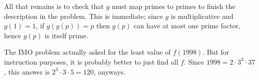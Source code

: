 All that remains is to check that $g$ must map primes to primes
to finish the description in the problem.
This is immediate; since $g$ is multiplicative and $g(1) = 1$,
if $g(g(p)) = p$ then $g(p)$ can have at most one prime factor,
hence $g(p)$ is itself prime.

\begin{remark*}
  The IMO problem actually asked for the least value of $f(1998)$.
  But for instruction purposes,
  it is probably better to just find all $f$.
  Since $1998 = 2 \cdot 3^3 \cdot 37$,
  this answer is $2^3 \cdot 3 \cdot 5 = 120$, anyways.
\end{remark*}
\pagebreak




